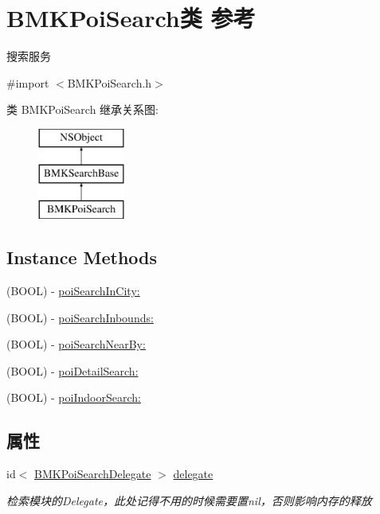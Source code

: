 \hypertarget{interface_b_m_k_poi_search}{}\section{B\+M\+K\+Poi\+Search类 参考}
\label{interface_b_m_k_poi_search}


搜索服务  




{\ttfamily \#import $<$B\+M\+K\+Poi\+Search.\+h$>$}

类 B\+M\+K\+Poi\+Search 继承关系图\+:\begin{figure}[H]
\begin{center}
\leavevmode
\includegraphics[height=3.000000cm]{interface_b_m_k_poi_search}
\end{center}
\end{figure}
\subsection*{Instance Methods}
\begin{DoxyCompactItemize}
\item 
(B\+O\+O\+L) -\/ \hyperlink{interface_b_m_k_poi_search_afd3f3ed4e5193e71ec0efada3172991e}{poi\+Search\+In\+City\+:}
\item 
(B\+O\+O\+L) -\/ \hyperlink{interface_b_m_k_poi_search_a6da39f1518d0dba9df8c31a1fd90b44f}{poi\+Search\+Inbounds\+:}
\item 
(B\+O\+O\+L) -\/ \hyperlink{interface_b_m_k_poi_search_a7abe377e0a0609058d5db2236b33aff1}{poi\+Search\+Near\+By\+:}
\item 
(B\+O\+O\+L) -\/ \hyperlink{interface_b_m_k_poi_search_aae3c3917b12d0212a78a90d4206b8e17}{poi\+Detail\+Search\+:}
\item 
(B\+O\+O\+L) -\/ \hyperlink{interface_b_m_k_poi_search_a44b9bffec763c9c2c1da9093cda1a906}{poi\+Indoor\+Search\+:}
\end{DoxyCompactItemize}
\subsection*{属性}
\begin{DoxyCompactItemize}
\item 
\hypertarget{interface_b_m_k_poi_search_a5cf63a1ba785de9592b81ba28acf90e4}{}id$<$ \hyperlink{protocol_b_m_k_poi_search_delegate-p}{B\+M\+K\+Poi\+Search\+Delegate} $>$ \hyperlink{interface_b_m_k_poi_search_a5cf63a1ba785de9592b81ba28acf90e4}{delegate}\label{interface_b_m_k_poi_search_a5cf63a1ba785de9592b81ba28acf90e4}

\begin{DoxyCompactList}\small\item\em 检索模块的\+Delegate，此处记得不用的时候需要置nil，否则影响内存的释放 \end{DoxyCompactList}\end{DoxyCompactItemize}


